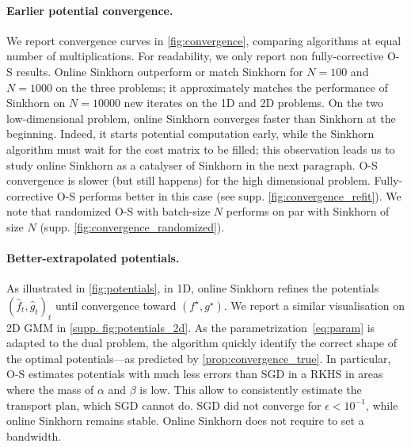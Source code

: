 \paragraph{Earlier potential convergence.} 
We report convergence curves in \autoref{fig:convergence}, comparing algorithms
at equal number of multiplications. For readability, we only report non
fully-corrective O-S results. Online Sinkhorn outperform or match Sinkhorn for $N=100$
and $N=1000$ on the three problems; it approximately matches the performance of
Sinkhorn on $N=10000$ new iterates on the 1D and 2D problems. On the two
low-dimensional problem, online Sinkhorn converges faster than Sinkhorn at the
beginning. Indeed, it starts potential computation early, while the Sinkhorn
algorithm must wait for the cost matrix to be filled;  this observation leads us
to study online Sinkhorn as a catalyser of Sinkhorn in the next paragraph. O-S
convergence is slower (but still happens) for the high dimensional problem.
Fully-corrective O-S performs better in this case (see supp. \autoref{fig:convergence_refit}). We note that
randomized O-S with batch-size $N$ performs on par with Sinkhorn of size $N$ (supp. \autoref{fig:convergence_randomized}).

\paragraph{Better-extrapolated potentials.} As illustrated in
\autoref{fig:potentials}, in 1D, online Sinkhorn refines the potentials $(\hat f_t, \hat g_t)_t$
until convergence toward $(f^\star, g^\star)$. We report a similar visualisation on 2D GMM in \autoref{supp. fig:potentials_2d}. As the parametrization~\eqref{eq:param} is 
adapted to the dual problem, the algorithm quickly identify the correct shape of
the optimal potentials---as predicted by \autoref{prop:convergence_true}. In
particular, O-S estimates potentials with much less errors than SGD in a RKHS in
areas where the mass of $\alpha$ and $\beta$ is low. This allow to consistently estimate the transport plan, which SGD cannot do. SGD did not converge
for $\epsilon < 10^{-1}$, while online Sinkhorn remains stable. Online
Sinkhorn does not require to set a bandwidth.


